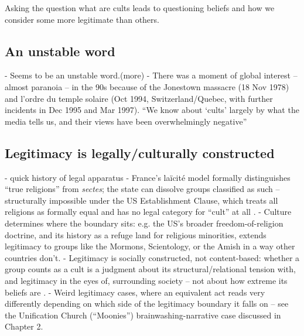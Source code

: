 Asking the question what are cults leads to questioning beliefs and how we consider some more legitimate than others. 



\subsection{An unstable word}
- Seems to be an unstable word.(more)
- There was a moment of global interest -- almost paranoia -- in the 90s because of the Jonestown massacre (18 Nov 1978) and l'ordre du temple solaire (Oct 1994, Switzerland/Quebec, with further incidents in Dec 1995 and Mar 1997).
``We know about `cults' largely by what the media tells us, and their views have been overwhelmingly negative\autocite{vandrielPrintMediaCoverage1988, pfeiferPsychologicalFramingCults1992}'' \autocite[pp.1]{dawsonCultsNewReligious2009}

\subsection{Legitimacy is legally/culturally constructed}
- quick history of legal apparatus
- France's la\"icit\'e model formally distinguishes ``true religions'' from \textit{sectes}; the state can dissolve groups classified as such -- structurally impossible under the US Establishment Clause, which treats all religions as formally equal and has no legal category for ``cult'' at all \autocite[pp.4]{adeliyantousUsingLawLimit2023}.
- Culture determines where the boundary sits: e.g. the US's broader freedom-of-religion doctrine, and its history as a refuge land for religious minorities, extends legitimacy to groups like the Mormons, Scientology, or the Amish in a way other countries don't.
- Legitimacy is socially constructed, not content-based: whether a group counts as a cult is a judgment about its structural/relational tension with, and legitimacy in the eyes of, surrounding society -- not about how extreme its beliefs are \autocite[pp.125]{starkChurchesSectsCults1979}.
- Weird legitimacy cases, where an equivalent act reads very differently depending on which side of the legitimacy boundary it falls on -- see the Unification Church (``Moonies'') brainwashing-narrative case discussed in Chapter 2.

